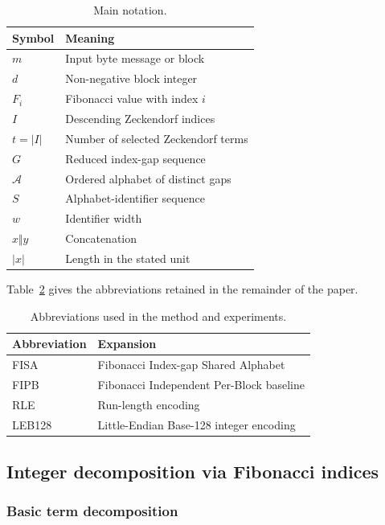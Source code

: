 \documentclass[a4paper,fleqn]{cas-dc}
\begin{document}
\begin{table}[t]
\caption{Main notation.}
\label{tab:notation}
\centering
\begin{tabular}{ll}
\toprule
Symbol & Meaning\\
\midrule
$m$ & Input byte message or block\\
$d$ & Non-negative block integer\\
$F_i$ & Fibonacci value with index $i$\\
$I$ & Descending Zeckendorf indices\\
$t=|I|$ & Number of selected Zeckendorf terms\\
$G$ & Reduced index-gap sequence\\
$\mathcal{A}$ & Ordered alphabet of distinct gaps\\
$S$ & Alphabet-identifier sequence\\
$w$ & Identifier width\\
$x\Vert y$ & Concatenation\\
$|x|$ & Length in the stated unit\\
\bottomrule
\end{tabular}
\end{table}

Table~\ref{tab:acronyms} gives the abbreviations retained in the remainder of
the paper.

\begin{table}[t]
\caption{Abbreviations used in the method and experiments.}
\label{tab:acronyms}
\centering
\begin{tabular}{ll}
\toprule
Abbreviation & Expansion\\
\midrule
FISA & Fibonacci Index-gap Shared Alphabet\\
FIPB & Fibonacci Independent Per-Block baseline\\
RLE & Run-length encoding\\
LEB128 & Little-Endian Base-128 integer encoding\\
\bottomrule
\end{tabular}
\end{table}

\subsection{Integer decomposition via Fibonacci indices}

\subsubsection{Basic term decomposition}
\end{document}
